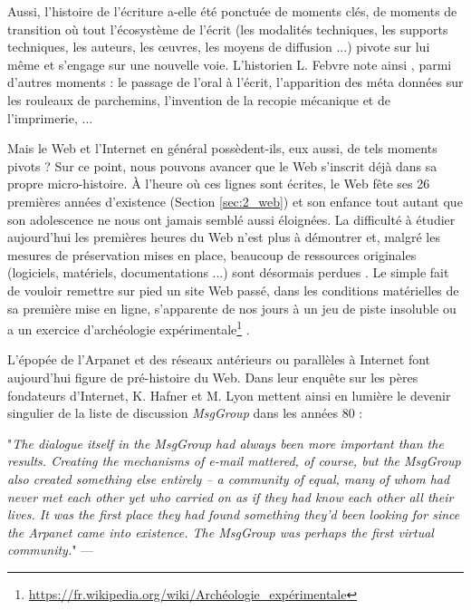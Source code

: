 \documentclass[symmetric,justified,marginals=raggedouter]{tufte-book}
\begin{document}
Aussi, l'histoire de l'écriture a-elle été ponctuée de moments clés, de moments de transition où tout l'écosystème de l'écrit (les modalités techniques, les supports techniques, les auteurs, les œuvres, les moyens de diffusion ...) pivote sur lui même et s'engage sur une nouvelle voie. L'historien L. Febvre note ainsi \citep{febvre_apparition_2013}, parmi d'autres moments : le passage de l'oral à l'écrit,  l'apparition des méta données sur les rouleaux de parchemins, l'invention de la recopie mécanique et de l'imprimerie, ...

Mais le Web et l'Internet en général possèdent-ils, eux aussi, de tels moments pivots ? Sur ce point, nous pouvons avancer que le Web s'inscrit déjà dans sa propre micro-histoire. À l'heure où ces lignes sont écrites, le Web fête ses 26 premières années d'existence (Section \ref{sec:2_web}) et son enfance tout autant que son adolescence ne nous ont jamais semblé aussi éloignées. La difficulté à étudier aujourd'hui les premières heures du Web n'est plus à démontrer \citep{gebeil_quand_2016} et, malgré les mesures de préservation mises en place, beaucoup de ressources originales (logiciels, matériels, documentations ...) sont désormais perdues \citep{helmond_historical_2017}. Le simple fait de vouloir remettre sur pied un site Web passé, dans les conditions matérielles de sa première mise en ligne, s'apparente de nos jours à un jeu de piste insoluble ou a un exercice d'archéologie expérimentale\footnote{\url{https://fr.wikipedia.org/wiki/Archéologie_expérimentale}} \citep{driscoll_searching_2017}. 

L'épopée de l'Arpanet \citep{russell_shadow_2014} et des réseaux antérieurs ou parallèles \citep{schafer_part_2015} à Internet font aujourd'hui figure de pré-histoire du Web. Dans leur enquête sur les pères fondateurs d'Internet, K. Hafner et M. Lyon mettent ainsi en lumière le devenir singulier de la liste de discussion \textit{MsgGroup} dans les années 80 :\\

\begin{fullwidth}
"\textit{The dialogue itself in the MsgGroup had always been more important than the results. Creating the mechanisms of e-mail mattered, of course, but the MsgGroup also created something else entirely -- a community of equal, many of whom had never met each other yet who carried on as if they had know each other all their lives. It was the first place they had found something they'd been looking for since the Arpanet came into existence. The MsgGroup was perhaps the first virtual community.}" --- \citep[p218]{hafner_where_1998}\\
\end{fullwidth} 
\end{document}
